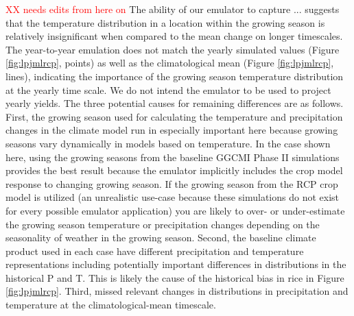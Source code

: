 \documentclass[gmd, manuscript]{copernicus} %
\begin{document}
\textcolor{red}{XX needs edits from here on} The ability of our emulator to capture ... suggests that the temperature distribution in a location within the growing season is relatively insignificant when compared to the mean change on longer timescales. 
The year-to-year emulation does not match the yearly simulated values (Figure \ref{fig:lpjmlrcp}, points) as well as the climatological mean (Figure \ref{fig:lpjmlrcp}, lines), indicating the importance of the growing season temperature distribution at the yearly time scale. 
We do not intend the emulator to be used to project yearly yields.
The three potential causes for remaining differences are as follows.
First, the growing season used for calculating the temperature and precipitation changes in the climate model run in especially important here because growing seasons vary dynamically in models based on temperature. 
In the case shown here, using the growing seasons from the baseline GGCMI Phase II simulations provides the best result because the emulator implicitly includes the crop model response to changing growing season. 
If the growing season from the RCP crop model is utilized (an unrealistic use-case because these simulations do not exist for every possible emulator application) you are likely to over- or under-estimate the growing season temperature or precipitation changes depending on the seasonality of weather in the growing season. 
Second, the baseline climate product used in each case have different precipitation and temperature representations including potentially important differences in distributions in the historical P and T. 
This is likely the cause of the historical bias in rice in Figure \ref{fig:lpjmlrcp}. 
Third, missed relevant changes in distributions in precipitation and temperature at the climatological-mean timescale.

\end{document}
